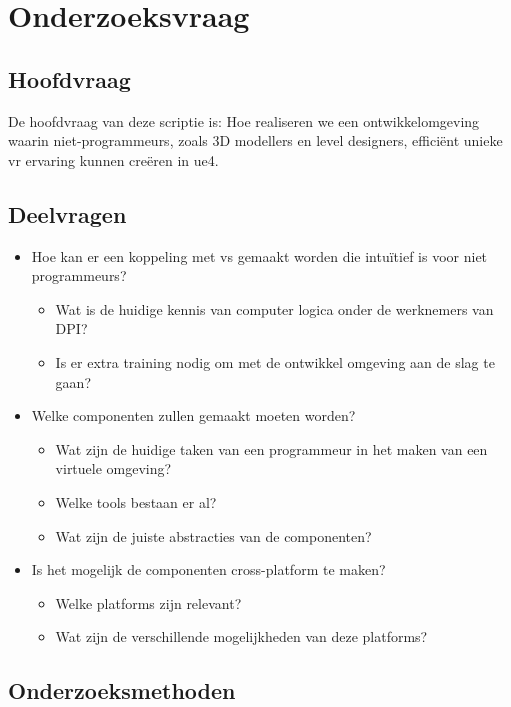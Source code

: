 \section{Onderzoeksvraag}

\subsection{Hoofdvraag}

De hoofdvraag van deze scriptie is: Hoe realiseren we een ontwikkelomgeving waarin niet-programmeurs, zoals 3D modellers en level designers, efficiënt unieke \gls{vr} ervaring kunnen creëren in \gls{ue4}.

\subsection{Deelvragen}

\begin{itemize}  
\item Hoe kan er een koppeling met \gls{vs} gemaakt worden die intuïtief is voor niet programmeurs? 
	\begin{itemize}
	\item Wat is de huidige kennis van computer logica onder de werknemers van DPI?
	\item Is er extra training nodig om met de ontwikkel omgeving aan de slag te gaan?
	\end{itemize}
\item Welke componenten zullen gemaakt moeten worden?
	\begin{itemize}
	\item Wat zijn de huidige taken van een programmeur in het maken van een virtuele omgeving?
	\item Welke tools bestaan er al?
	\item Wat zijn de juiste abstracties van de componenten? 
	\end{itemize}
\item Is het mogelijk de componenten cross-platform te maken?
	\begin{itemize}
	\item Welke platforms zijn relevant?
	\item Wat zijn de verschillende mogelijkheden van deze platforms?
	\end{itemize}
\end{itemize}

\subsection{Onderzoeksmethoden}
\label{subsec:onderzoeksmethoden}

